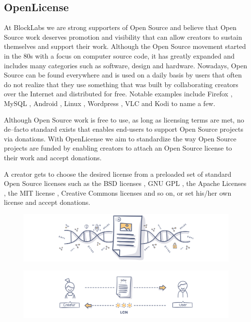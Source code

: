\subsection{OpenLicense}

At BlockLabs we are strong supporters of Open Source and believe that Open Source work deserves promotion and visibility that can allow creators to sustain themselves and support their work. Although the Open Source movement started in the 80s with a focus on computer source code, it has greatly expanded and includes many categories such as software, design and hardware. Nowadays, Open Source can be found everywhere and is used on a daily basis by users that often do not realize that they use something that was built by collaborating creators over the Internet and distributed for free. Notable examples include Firefox \cite{firefox}, MySQL \cite{mysql}, Android \cite{android}, Linux \cite{linux}, Wordpress \cite{wordpress}, VLC \cite{vlc} and Kodi \cite{kodi} to name a few.

Although Open Source work is free to use, as long as licensing terms are met, no de--facto standard exists that enables end-users to support Open Source projects via donations. With OpenLicense we aim to standardize the way Open Source projects are funded by enabling creators to attach an Open Source license to their work and accept donations.

A creator gets to choose the desired license from a preloaded set of standard Open Source licenses such as the BSD licenses \cite{bsd}, GNU GPL \cite{gpl}, the Apache Licenses \cite{apache}, the MIT license \cite{mit}, Creative Commons  licenses \cite{cc} and so on, or set his/her own license and accept donations. 
 
\begin{figure}[!b]
\centering
\begin{minipage}{1\textwidth}
  \centering
  \includegraphics[width=1\linewidth]{./figures/fig3.png}
  \label{fig:licensing}
\end{minipage}%
\end{figure}
\begin{figure}[!t]
\centering
\begin{minipage}{1\textwidth}
  \centering
  \includegraphics[width=1\linewidth]{./figures/fig4.png}
  \label{fig:donations}
\end{minipage}
\end{figure}


